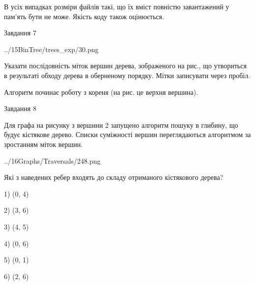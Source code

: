 \documentclass[12pt, ukrainian]{article}
\begin{document}
{В усіх випадках розміри файлів такі, що їх вміст повністю завантажений у пам'ять бути не може. Якість коду також оцінюється.



\vspace{10mm}\par

\newpage
\begin{minipage}[t]{9.7cm}
               
{\begin{center}Завдання {7}\end{center}}
\vspace{-4mm}

\begin{center}
	{../15BinTree/trees_exp/30.png}
\end{center}
Указати послідовність міток вершин дерева, зображеного на рис., що утвориться в результаті обходу дерева в оберненому порядку. Мітки записувати через пробіл.\par Алгоритм починає роботу з кореня (на рис. це верхня вершина).\par

\end{minipage}
\vline \hspace{8mm}
\begin{minipage}[t]{8.0cm}
               
{\begin{center}Завдання {8}\end{center}}
\vspace{-4mm}
Для графа на рисунку з вершини 2 запущено алгоритм пошуку в глибину, що будує кістякове дерево. Списки суміжності вершин переглядаються алгоритмом за зростанням міток вершин.\par
\begin{center}
	{../16Graphs/Traversals/248.png}
\end{center}
\par Які з наведених ребер входять до складу отриманого кістякового дерева?\par
1) (0, 4)\par
2) (3, 6)\par
3) (4, 5)\par
4) (0, 6)\par
5) (0, 1)\par
6) (2, 6)\par
{\vskip 15pt} \par


\end{minipage}}
\end{document}
